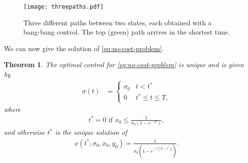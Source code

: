 \documentclass[english,12pt,letter]{article}
\newtheorem{thm}{Theorem}
\newcommand{\Rnot}{\sigma_0}
\begin{document}
\begin{figure}
    \centering
    \texttt{[image: threepaths.pdf]}
    \caption{Three different paths between two states, each obtained
    with a bang-bang control.  The top (green) path arrives in the shortest time.\label{fig:bangbangtraj}}
\end{figure}
We can now give the solution of \eqref{eq:no-cost-problem}.
\begin{thm} \label{thm:no-cost}
The optimal control for \eqref{eq:no-cost-problem} is unique and is given by
\begin{align}
    \sigma(t) & = \begin{cases}  
        \Rnot & t<t^* \\
        0 & t^* \le  t \le T,
    \end{cases}
\end{align}
where 
\begin{align} \label{eq:dropcond}
    t^*=0 \text{ if } x_0\le\frac{1}{\sigma_0(1-e^{-\gamma T})},
\end{align}
and otherwise $t^*$ is the unique solution of
\begin{align} \label{xtstar}
    x(t^*;\Rnot,x_0,y_0) = \frac{1}{\sigma_0(1-e^{-\gamma(T-t^*)})}.
\end{align}
\end{thm}
\end{document}
